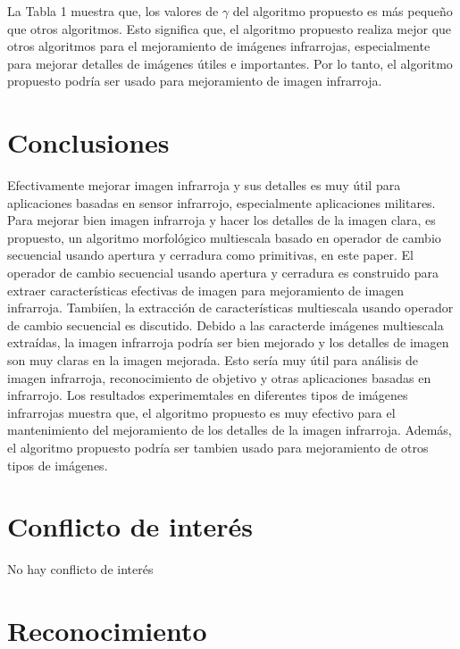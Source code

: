 \documentclass[a4paper, 11 pt, conference]{ieeeconf}      %
\begin{document}
\normalsize

La Tabla 1 muestra que, los valores de $\gamma$ del algoritmo propuesto es m\'as pequeño que otros algoritmos. Esto significa que, el algoritmo propuesto realiza mejor que otros algoritmos para el mejoramiento de im\'agenes infrarrojas, especialmente para mejorar detalles de im\'agenes \'utiles e importantes. Por lo tanto, el algoritmo propuesto podr\'ia ser usado para mejoramiento de imagen infrarroja.

\section{Conclusiones}

Efectivamente mejorar imagen infrarroja y sus detalles es muy \'util para aplicaciones basadas en sensor infrarrojo, especialmente aplicaciones militares. Para mejorar bien imagen infrarroja y hacer los detalles de la imagen clara, es propuesto, un algoritmo morfol\'ogico multiescala basado en operador de cambio secuencial usando apertura y cerradura como primitivas, en este paper. El operador de cambio secuencial usando apertura y cerradura es construido para extraer caracter\'isticas efectivas de imagen para mejoramiento de imagen infrarroja. Tambi\'ien, la extracci\'on de caracter\'isticas multiescala usando operador de cambio secuencial es discutido. Debido a las caracter\isticas de im\'agenes multiescala extra\'idas, la imagen infrarroja podr\'ia ser bien mejorado y los detalles de imagen son muy claras en la imagen mejorada. Esto ser\'ia muy \'util para an\'alisis de imagen infrarroja, reconocimiento de objetivo y otras aplicaciones basadas en infrarrojo. Los resultados experimemtales en diferentes tipos de im\'agenes infrarrojas muestra que, el algoritmo propuesto es muy efectivo para el mantenimiento del mejoramiento de los detalles de la imagen infrarroja. Adem\'as, el algoritmo propuesto podr\'ia ser tambien usado para mejoramiento de otros tipos de im\'agenes.

\section*{\textbf{Conflicto de inter\'es}}

No hay conflicto de inter\'es

\section*{\textbf{Reconocimiento}}
\end{document}

